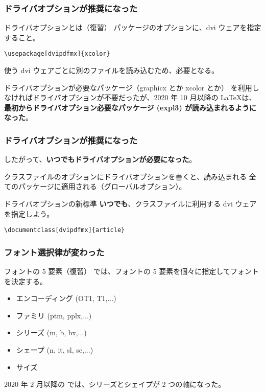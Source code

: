 \documentclass[aspectratio=149]{beamer}
\newcommand{\hmemph}[1]{\textbf{#1}}
\begin{document}
\begin{frame}
	\frametitle{ドライバオプションが推奨になった}
	\begin{block}{ドライバオプションとは（復習）}
		パッケージのオプションに、dvi ウェアを指定すること。
		
		\texttt{\textbackslash usepackage[dvipdfmx]\{xcolor\}}
		
		使う dvi ウェアごとに別のファイルを読み込むため、必要となる。
	\end{block}
	
	ドライバオプションが必要なパッケージ（graphicx とか xcolor とか）
	を利用しなければドライバオプションが不要だったが、2020 年 10 月以降の \LaTeX は、
	\hmemph{最初からドライバオプション必要なパッケージ (expl3) が読み込まれるようになった}。
\end{frame}

\begin{frame}
	\frametitle{ドライバオプションが推奨になった}
	したがって、\hmemph{いつでもドライバオプションが必要になった}。
	
	クラスファイルのオプションにドライバオプションを書くと、読み込まれる
	全てのパッケージに適用される（グローバルオプション）。
	
	\begin{block}{ドライバオプションの新標準}
		\hmemph{いつでも}、クラスファイルに利用する dvi ウェアを指定しよう。
		
		\texttt{\textbackslash documentclass[dvipdfmx]\{article\}}
	\end{block}
\end{frame}

\begin{frame}
	\frametitle{フォント選択律が変わった}
	\begin{block}{フォントの 5 要素（復習）}
		\LaTeXe では、フォントの 5 要素を個々に指定してフォントを決定する。
		\begin{itemize}
			\item エンコーディング (OT1, T1,...)
			\item ファミリ ({ptm}, {pplx},...)
			\item シリーズ ({m}, {b}, {bx},...)
			\item シェープ ({n}, {it},
				{sl}, {sc},...)
			\item サイズ
		\end{itemize}
	\end{block}
	
	2020 年 2 月以降の \LaTeXe では、シリーズとシェイプが 2 つの軸になった。
\end{frame}
\end{document}
